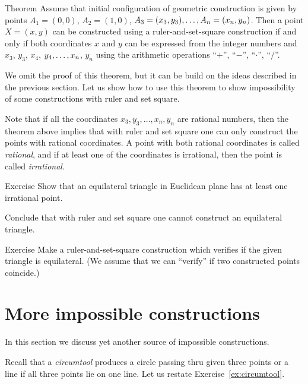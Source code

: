 \begin{thm}{Theorem}
Assume that initial configuration of geometric construction is given by points $A_1=(0,0)$, $A_2=(1,0)$, $A_3=(x_3,y_3),\z\dots,A_n=(x_n,y_n)$.
Then a point $X=(x,y)$ can be constructed using a ruler-and-set-square construction
if and only if both coordinates $x$ and $y$ can be expressed from the integer numbers and $x_3$, $y_3$, $x_4$, $y_4,\z\dots,x_n$, $y_n$ using the arithmetic operations ``$+$'', ``$-$'', ``$\cdot$'', ``$/$''. 
\end{thm}

We omit the proof of this theorem, but it can be build on the ideas described in the previous section. 
Let us show how to use this theorem to show impossibility of some constructions with ruler and set square.

Note that if all the coordinates $x_3,y_3,\dots,x_n,y_n$ are rational numbers, then the theorem above implies that with ruler and set square one can only construct the points with rational coordinates.
A point with both rational coordinates is called \emph{rational},
and if at least one of the coordinates is irrational, then the point is called \emph{irrational}.

\begin{thm}{Exercise}\label{ex:equilateral triangle}
Show that an equilateral triangle in Euclidean plane has at least one irrational point.

Conclude that with ruler and set square one cannot construct an equilateral triangle.
\end{thm}


\begin{thm}{Exercise}\label{ex:equilateral triangle-verify}
Make a ruler-and-set-square construction which verifies if the given triangle is  equilateral.
(We assume that we can ``verify'' if two constructed points coincide.) 
\end{thm}


\section*{More impossible constructions}

In this section we discuss yet another source of impossible constructions. 

Recall that a \emph{circumtool} produces a circle passing thru given three points
or a line if all three points lie on one line.
Let us restate Exercise~\ref{ex:circumtool}.

